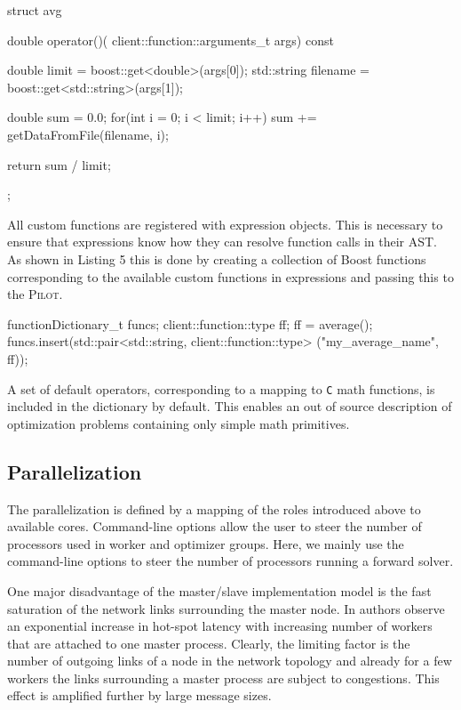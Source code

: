 \documentclass[%
reprint,
amsmath,amssymb,
aps,
prstab,
]{revtex4-1}
\begin{document}
\begin{code}
struct avg {

    double operator()(
      client::function::arguments_t args) const {

        double limit = boost::get<double>(args[0]);
        std::string filename =
          boost::get<std::string>(args[1]);

        double sum = 0.0;
        for(int i = 0; i < limit; i++)
            sum += getDataFromFile(filename, i);

        return sum / limit;
    }
};
\end{code}

All custom functions are registered with expression objects.
This is necessary to ensure that expressions know how they can resolve
  function calls in their AST.
As shown in Listing 5 this is done by creating a collection of Boost
  functions~\cite{boost3} corresponding to the
  available custom functions in expressions and passing this to the
  \textsc{Pilot}.

\begin{code}
functionDictionary_t funcs;
client::function::type ff;
ff = average();
funcs.insert(std::pair<std::string, 
		client::function::type> 
       		("my_average_name", ff));
\end{code}

A set of default operators, corresponding to a mapping to \texttt{C} math
  functions, is included in the dictionary by default.
This enables an out of source description of optimization problems containing
  only simple math primitives.


\subsection{Parallelization} \label{sec:parallelization}

The parallelization is defined by a mapping of the roles introduced above to
  available cores.
Command-line options allow the user to steer the number of processors used in
  worker and optimizer groups.
Here, we mainly use the command-line options to steer the number of processors
  running a forward solver.

One major disadvantage of the master/slave implementation model is the fast
  saturation of the network links surrounding the master node.
In \cite{bctg:09} authors observe an exponential increase in hot-spot latency
  with increasing number of workers that are attached to one master process.
Clearly, the limiting factor is the number of outgoing links of a node in the
  network topology and already for a few workers the links surrounding a
  master process are subject to congestions.
This effect is amplified further by large message sizes.
\end{document}
